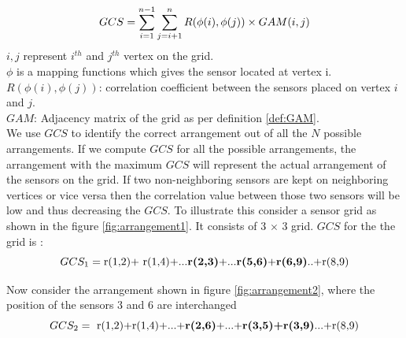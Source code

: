 \begin{equation}
\centering
GCS=\sum_{i=1}^{n-1}\sum_{j=i+1}^{n} R(\phi(i),\phi(j))  \times GAM(i,j)
\label{eq:gridCorrelationSum}
\end{equation}
$i,j$ represent $ i^{th}$ and $ j^{th}$ vertex on the grid.\\
$\phi$ is a mapping functions which gives the sensor located at vertex i.\\
$ R(\phi(i),\phi(j))$: correlation coefficient between the sensors placed on vertex $i$ and $j$.\\
$GAM$:  Adjacency matrix of the grid as per definition \ref{def:GAM}.\\

We use $GCS$ to identify the correct arrangement out of all the $N$ possible arrangements. If we compute  $GCS$ for all the possible arrangements, the arrangement with the maximum $GCS$ will represent the actual arrangement of the sensors on the grid.  
If two non-neighboring sensors are kept on neighboring vertices or vice versa then the correlation value between those two sensors will be low and thus decreasing the $GCS$.
To illustrate this consider a sensor grid as shown in the figure \ref{fig:arrangement1}.
 It consists of 3 $\times$ 3 grid.  
$GCS$ for the  the grid is :\\
\begin{equation*}
GCS_{1}=\text{r(1,2)+ r(1,4)+...\textbf{r(2,3)}+...\textbf{r(5,6)}+\textbf{r(6,9)}..+r(8,9)}
\end{equation*}

Now consider the arrangement shown in figure \ref{fig:arrangement2}, where the position of the sensors 3 and 6 are interchanged\\
\begin{equation*}
GCS_{2}=\text{ r(1,2)+r(1,4)+...+\textbf{r(2,6)}+...+\textbf{r(3,5)+r(3,9)}...+r(8,9)}
\end{equation*}

